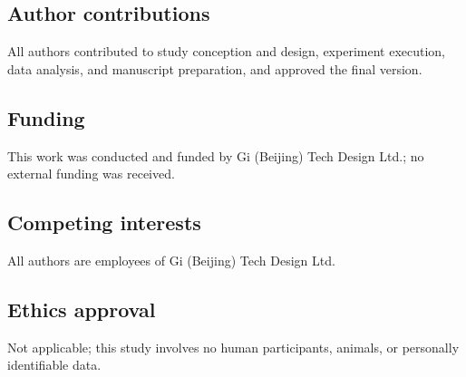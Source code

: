\documentclass[11pt]{article}
\begin{document}
\subsection*{Author contributions}
All authors contributed to study conception and design, experiment execution, data analysis, and manuscript preparation, and approved the final version.

\subsection*{Funding}
This work was conducted and funded by Gi (Beijing) Tech Design Ltd.; no external funding was received.

\subsection*{Competing interests}
All authors are employees of Gi (Beijing) Tech Design Ltd.

\subsection*{Ethics approval}
Not applicable; this study involves no human participants, animals, or personally identifiable data.
\end{document}
